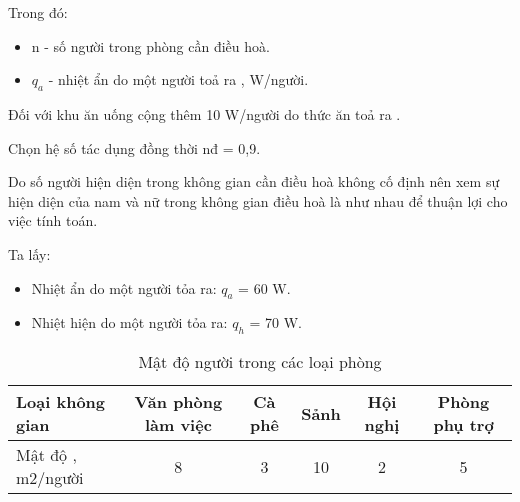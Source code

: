 Trong đó:
\begin{itemize}
	\item n - số người trong phòng cần điều hoà.
	\item $q_{a}$ -  nhiệt ẩn do một người toả ra , W/người.
\end{itemize}

Đối với khu ăn uống cộng thêm 10 W/người do thức ăn toả ra .

Chọn hệ số tác dụng đồng thời n{\scriptsize đ} = 0,9.

Do số người hiện diện trong không gian cần điều hoà không cố định nên xem sự hiện diện của nam và nữ trong không gian điều hoà là như nhau để thuận lợi cho việc tính toán.

Ta lấy:
\begin{itemize}[label={-}]
	\item Nhiệt ẩn do một người tỏa ra: $q_{a}$ = 60 W.
	\item Nhiệt hiện do một người tỏa ra: $q_{h}$ = 70 W.
\end{itemize}

\begin{table}[H]
	\centering
	\caption{Mật độ người trong các loại phòng}
	\begin{adjustbox}{width=\textwidth}
	\begin{tabular}{|p{10.785em}|c|c|c|c|c|}
		\hline
		\textbf{Loại không  gian} & \multicolumn{1}{p{7.285em}|}{\textbf{Văn phòng làm việc}} & \multicolumn{1}{p{4.07em}|}{\textbf{Cà phê}} & \multicolumn{1}{p{4.07em}|}{\textbf{Sảnh}} & \multicolumn{1}{p{4.07em}|}{\textbf{Hội nghị}} & \multicolumn{1}{p{6.785em}|}{\textbf{Phòng phụ trợ}} \bigstrut\\
		\hline
		Mật độ , m2/người & 8        & 3        & 10       & 2        & 5 \bigstrut\\
		\hline
	\end{tabular}%
	\end{adjustbox}
	\label{b:mdn}%
\end{table}%

